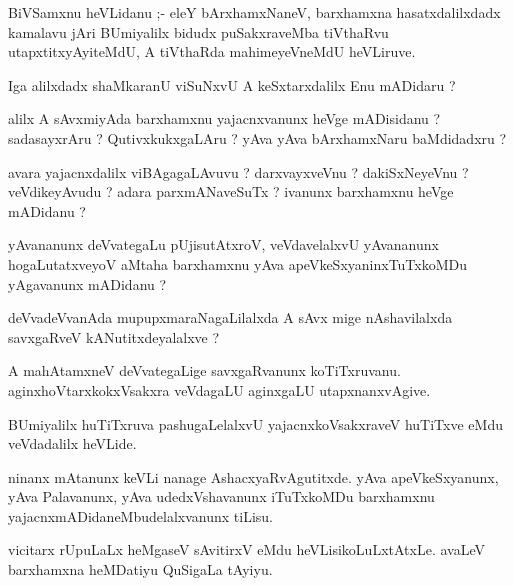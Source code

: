 \documentclass{article}
\begin{document}
 



\begin{mn}
BiVSamxnu heVLidanu ;- eleY bArxhamxNaneV,  barxhamxna hasatxdalilxdadx kamalavu jAri BUmiyalilx 
bidudx puSakxraveMba tiVthaRvu  utapxtitxyAyiteMdU, A  tiVthaRda mahimeyeVneMdU heVLiruve.
\end{mn}

\begin{mn}
Iga alilxdadx shaMkaranU viSuNxvU A keSxtarxdalilx Enu mADidaru ?
\end{mn}

\begin{mn}
alilx A sAvxmiyAda barxhamxnu yajacnxvanunx heVge mADisidanu ?  sadasayxrAru ?  QutivxkukxgaLAru ?  
yAva yAva bArxhamxNaru baMdidadxru ? 
\end{mn}

\begin{mn}
avara yajacnxdalilx viBAgagaLAvuvu ?  darxvayxveVnu ?  dakiSxNeyeVnu ? veVdikeyAvudu ?  
adara parxmANaveSuTx ?  ivanunx barxhamxnu heVge mADidanu ?
\end{mn}

\begin{mn}
yAvananunx deVvategaLu pUjisutAtxroV, veVdavelalxvU yAvananunx hogaLutatxveyoV aMtaha 
barxhamxnu yAva apeVkeSxyaninxTuTxkoMDu yAgavanunx mADidanu ?
\end{mn}

\begin{mn}
deVvadeVvanAda  mupupxmaraNagaLilalxda A sAvx	mige nAshavilalxda savxgaRveV kANutitxdeyalalxve ?
\end{mn}

\begin{mn}
A mahAtamxneV deVvategaLige  savxgaRvanunx koTiTxruvanu.  aginxhoVtarxkokxVsakxra 
veVdagaLU aginxgaLU  utapxnanxvAgive.
\end{mn}

\begin{mn}
BUmiyalilx huTiTxruva  pashugaLelalxvU yajacnxkoVsakxraveV huTiTxve eMdu veVdadalilx  heVLide.
\end{mn}

\begin{mn}
ninanx mAtanunx keVLi nanage AshacxyaRvAgutitxde.  yAva apeVkeSxyanunx,  yAva  Palavanunx,  
yAva udedxVshavanunx iTuTxkoMDu barxhamxnu yajacnxmADidaneMbudelalxvanunx tiLisu.
\end{mn}

\begin{mn}
vicitarx rUpuLaLx  heMgaseV sAvitirxV  eMdu heVLisikoLuLxtAtxLe. avaLeV barxhamxna heMDatiyu   QuSigaLa tAyiyu. 
\end{mn}
\end{document}
